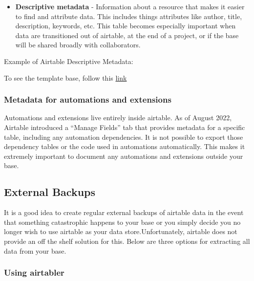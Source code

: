 \documentclass[
]{book}
\providecommand{\tightlist}{%
  \setlength{\itemsep}{0pt}\setlength{\parskip}{0pt}}
\begin{document}
\begin{itemize}
\tightlist
\item
  \textbf{Descriptive metadata} - Information about a resource that makes it easier to
  find and attribute data. This includes things attributes like author, title, description,
  keywords, etc. This table becomes especially important when data are transitioned
  out of airtable, at the end of a project, or if the base will be shared broadly
  with collaborators.
\end{itemize}

Example of Airtable Descriptive Metadata:

To see the template base, follow this \href{https://airtable.com/invite/l?inviteId=inv5ycCAbIVw1WM3Z\&inviteToken=ef7b72e998a0a69d835244f87f88b6b9b6b1094915239ebc93423e1257fcd72b\&utm_medium=email\&utm_source=product_team\&utm_content=transactional-alerts}{link}

\hypertarget{metadata-for-automations-and-extensions}{%
\subsubsection{Metadata for automations and extensions}\label{metadata-for-automations-and-extensions}}

Automations and extensions live entirely inside airtable. As of August 2022, Airtable introduced a ``Manage Fields'' tab that provides metadata for a specific table, including any automation dependencies. It is not possible to export those dependency tables or the code used in automations automatically. This makes it extremely important to document any automations and extensions outside your base.

\hypertarget{external-backups}{%
\subsection{External Backups}\label{external-backups}}

It is a good idea to create regular external backups of airtable data in the event
that something catastrophic happens to your base or you simply decide you no longer wish
to use airtable as your data store.Unfortunately, airtable does not provide an
off the shelf solution for this. Below are three options for extracting all data
from your base.

\hypertarget{using-airtabler}{%
\subsubsection{Using airtabler}\label{using-airtabler}}
\end{document}

